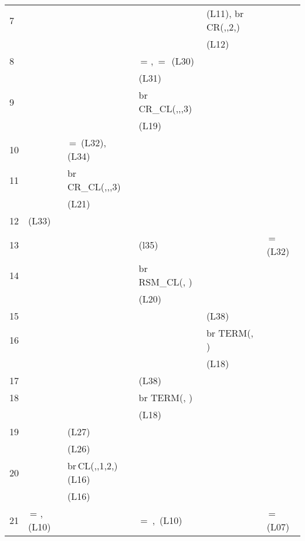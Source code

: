 \documentclass[11pt,english]{article}
\begin{document}
\begin{table}[h]
\begin{tabular}{|p{0.66cm}|p{2.7cm}|p{3.4cm}|p{2.95 cm}|p{2.46cm}|p{1.93cm}|}
 7 & & & &   (L11), \hspace{8 pt} br CR(,,2,) & \\
& &  &   &  (L12)&  \\\hline 

8 & &  & \,=\,\,, \hspace{25 pt} \,=\,\, (L30) &   & \\
& &  &   (L31) &  &  \\\hline 

9 & &  & \hspace{-4 pt} br CR\_CL(,,,3) &   & \\
& &  &  (L19) &  &  \\\hline 

10 & & \,=\,\,\,(L32), \hspace{20 pt} (L34) &  &   &  \\\hline 

11 & &  br CR\_CL(,,,3) &  &   & \\
& &  (L21) &   &  &  \\\hline

12 &  (L33) & &  &    &    \\\hline

13 & & &  (l35)  &    & \hspace{-7.9 pt}\,=\,\, (L32) 
 \\\hline

14 & & & br RSM\_CL(,  )  &    &  \\
& & &  (L20)   &  &  \\\hline

15 & & &  &   (L38)   &   \\\hline

16 & & &  & br TERM(,  )  &  \\
& & &   &  (L18) &  \\\hline

17 & & &  (L38) &    &   \\\hline


18 & & & br TERM(,  ) &   &  \\
& & &   (L18) &  &  \\\hline

19 & &   (L27)  &  &   &  \\
& &  (L26) & &  &  \\\hline

20 & &  br\,CL(,,1,2,)\,(L16)  &  &   &  \\
& &  (L16) & &  &  \\\hline

21 & \,=\,\,,  (L10) &  & \,=\,\,\,,\, \hspace{20 pt}  (L10) &   & \hspace{-5 pt}\,=\,\, \hspace{-1 pt}  (L07)  \\\hline



\end{tabular}
\end{table}
\end{document}
